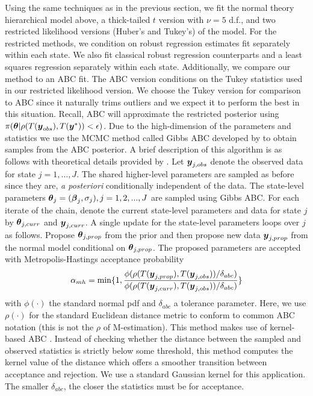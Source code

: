 \documentclass[ba]{imsart}
\def\bth{\mbox{\boldmath $\theta$}}
\def\bbeta{\mbox{\boldmath $\beta$}}
\newcommand{\by}{\mbox{\boldmath $y$}}
\begin{document}
Using the same techniques as in the previous section, 
we fit the normal theory hierarchical model above, a thick-tailed $t$ version with $\nu = 5$ d.f., and two restricted likelihood versions (Huber's and Tukey's) of the model.  For the restricted methods, we condition on robust regression estimates fit separately within each state. We also fit classical robust regression counterparts and a least squares regression separately within each state. 
Additionally, we compare our method to an ABC fit. The ABC version conditions on the Tukey statistics used in our restricted likelihood version. We choose the Tukey version for comparison to ABC since it naturally trims outliers and we expect it to perform the best in this situation. Recall, ABC will approximate the restricted posterior using $\pi(\bth | \rho(T(\by_{obs}), T(\by^{*})) < \epsilon)$. Due to the high-dimension of the parameters and statistics we use the MCMC method called Gibbs ABC developed by \cite{turner2014} to obtain samples from the ABC posterior.
A brief description of this algorithm is as follows with theoretical details provided by  \cite{turner2014}. Let $\by_{j, obs}$ denote the observed data for state $j = 1,\dots, J$.  The shared higher-level parameters are sampled as before since they are, {\em a posteriori} conditionally independent of the data. The state-level parameters $\bth_{j} = (\bbeta_{j}, \sigma_{j}), j = 1, 2, ..., J$ are sampled using Gibbs ABC.  For each iterate of the chain, denote the current state-level parameters and data for state $j$ by $\bth_{j, curr}$ and $\by_{j, curr}$. A single update for the state-level parameters loops over $j$ as follows. Propose $\bth_{j, prop}$ from the prior and then propose new data $\by_{j, prop}$ from the normal model conditional on $\bth_{j, prop}$. The proposed parameters are accepted with Metropolis-Hastings acceptance probability
\begin{align}
\label{eq:mhabc}
\alpha_{mh} = \min\{1, \frac{\phi(\rho(T(\by_{j, prop}), T(\by_{j, obs}))/\delta_{abc})}{\phi(\rho(T(\by_{j, curr}), T(\by_{j, obs}))/\delta_{abc})}\}
\end{align}
with $\phi(\cdot)$ the standard normal pdf and $\delta_{abc}$ a tolerance parameter. Here, we use $\rho(\cdot)$ for the standard Euclidean distance metric to conform to common ABC notation (this is not the $\rho$ of M-estimation). This method makes use of kernel-based ABC \citep{wilkinson2013}. Instead of checking whether the distance between the sampled and observed statistics is strictly below some threshold, this method computes the kernel value of the distance which offers a smoother transition between acceptance and rejection. We use a standard Gaussian kernel for this application. The smaller $\delta_{abc}$, the closer the statistics must be for acceptance. 
\end{document}
